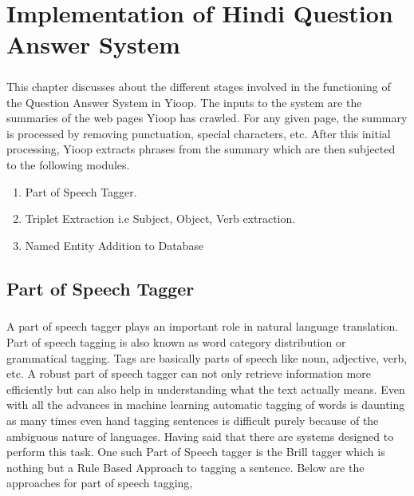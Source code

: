 \chapter{Implementation of Hindi Question Answer System}

\paragraph{}
This chapter discusses about the different stages involved in the functioning of the  Question Answer System in Yioop. The inputs to the system are the summaries of the web pages Yioop has crawled. For any given page, the summary is processed  by removing punctuation, special characters, etc. After this initial processing, Yioop extracts phrases from the summary which are then subjected to the following modules.

\begin{enumerate} 
\item Part of Speech Tagger.
\item Triplet Extraction i.e Subject, Object, Verb extraction.
\item Named Entity Addition to Database
\end{enumerate}

\section{Part of Speech Tagger}
\paragraph{}
A part of speech tagger plays an important role in natural language translation. Part of speech tagging is also known as word category distribution or grammatical tagging. Tags are basically parts of speech like noun, adjective, verb, etc.   A robust part of speech tagger  can not only retrieve information more efficiently but can also help in understanding what the text actually means. Even with all the advances in machine learning automatic tagging of words  is daunting as many times even hand tagging sentences is difficult purely because of the ambiguous nature of languages. Having said that there are systems designed to perform this task. One such Part of Speech tagger is the Brill tagger  \cite {brill1992simple} which is nothing but a Rule Based Approach to tagging a sentence. Below are the approaches for part of speech tagging, 

